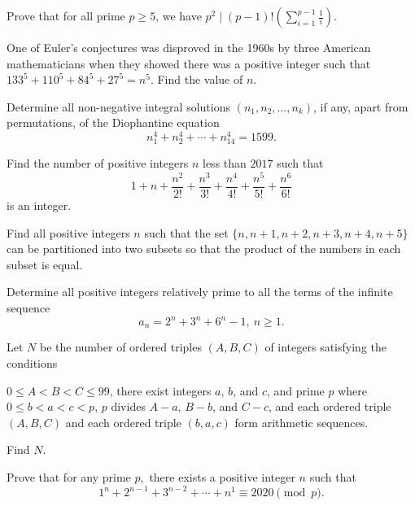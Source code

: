 \documentclass{article}
\begin{document}
\begin{prob}{6}
Prove that for all prime $p\ge5$, we have $p^2\mid (p-1)!\left(\sum\limits_{i=1}^{p-1}\frac1{i}\right)$.
\end{prob}
    
\begin{prob}[AIME 1989/9]{6}
One of Euler's conjectures was disproved in the 1960s by three American mathematicians when they showed there was a positive integer such that $133^5+110^5+84^5+27^5=n^{5}$. Find the value of $n$.
\end{prob}
    
\begin{prob}[USAMO 1979/1]{6}
Determine all non-negative integral solutions $(n_1, n_2, \dots , n_k)$, if any, apart from permutations, of the Diophantine equation
$$n_1^4 + n_2^4 + \cdots + n_{14}^{4} = 1599.$$
\end{prob}

\begin{prob}[AIME II 2017/8]{6}
Find the number of positive integers $n$ less than $2017$ such that
\[ 1+n+\frac{n^2}{2!}+\frac{n^3}{3!}+\frac{n^4}{4!}+\frac{n^5}{5!}+\frac{n^6}{6!} \]is an integer.
\end{prob}

\begin{prob}[IMO 1970/4]{6}
Find all positive integers $n$ such that the set $\{n,n+1,n+2,n+3,n+4,n+5\}$ can be partitioned into two subsets so that the product of the numbers in each subset is equal.
\end{prob}

\begin{prob}[IMO 2005/4]{9}
Determine all positive integers relatively prime to all the terms of the infinite sequence
\[a_n=2^n+3^n+6^n -1,\ n\geq 1.\]
\end{prob}

\begin{prob}[AIME I 2013/15]{13}
Let $N$ be the number of ordered triples $(A,B,C)$ of integers satisfying the conditions
\begin{itemize}
\Item $0\le A<B<C\le99$,
\Item there exist integers $a$, $b$, and $c$, and prime $p$ where $0\le b<a<c<p$,
\Item $p$ divides $A-a$, $B-b$, and $C-c$, and
\Item each ordered triple $(A,B,C)$ and each ordered triple $(b,a,c)$ form arithmetic sequences.
\end{itemize}
Find $N$.
\end{prob}

\begin{prob}[USEMO 2019/4]{13}
Prove that for any prime $p,$ there exists a positive integer $n$ such that
\[1^n+2^{n-1}+3^{n-2}+\cdots+n^1\equiv 2020\pmod{p}.\]
\end{prob}
\end{document}
